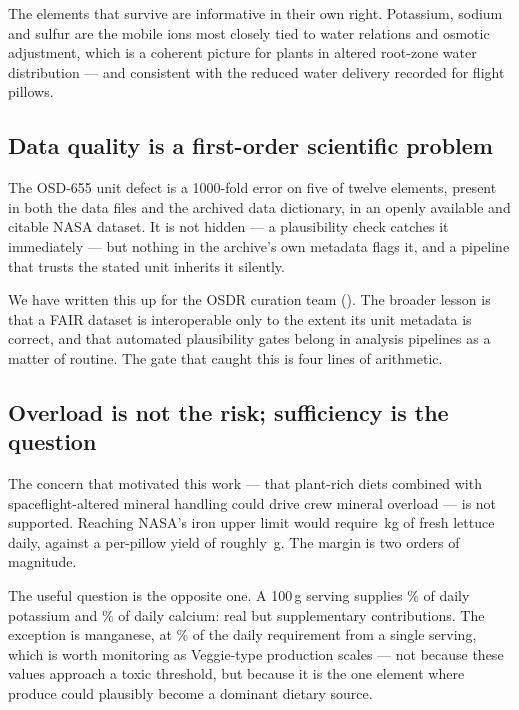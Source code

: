 The elements that survive are informative in their own right. Potassium, sodium
and sulfur are the mobile ions most closely tied to water relations and
osmotic adjustment, which is a coherent picture for plants in altered
root-zone water distribution --- and consistent with the reduced water delivery
recorded for flight pillows.

\subsection{Data quality is a first-order scientific problem}

The OSD-655 unit defect is a 1000-fold error on five of twelve elements, present
in both the data files and the archived data dictionary, in an openly available
and citable NASA dataset. It is not hidden --- a plausibility check catches it
immediately --- but nothing in the archive's own metadata flags it, and a
pipeline that trusts the stated unit inherits it silently.

We have written this up for the OSDR curation team
(). The broader lesson is that a FAIR
dataset is interoperable only to the extent its unit metadata is correct, and
that automated plausibility gates belong in analysis pipelines as a matter of
routine. The gate that caught this is four lines of arithmetic.

\subsection{Overload is not the risk; sufficiency is the question}

The concern that motivated this work --- that plant-rich diets combined with
spaceflight-altered mineral handling could drive crew mineral overload --- is
not supported. Reaching NASA's iron upper limit would require
\OverloadFeLet\,kg of fresh lettuce daily, against a per-pillow yield of
roughly \BiomassFlight\,g. The margin is two orders of magnitude.

The useful question is the opposite one. A 100\,g serving supplies
\ServeLetK\% of daily potassium and \ServeLetCa\% of daily calcium: real but
supplementary contributions. The exception is manganese, at \ServeLetMn\% of
the daily requirement from a single serving, which is worth monitoring as
Veggie-type production scales --- not because these values approach a toxic
threshold, but because it is the one element where produce could plausibly
become a dominant dietary source.

